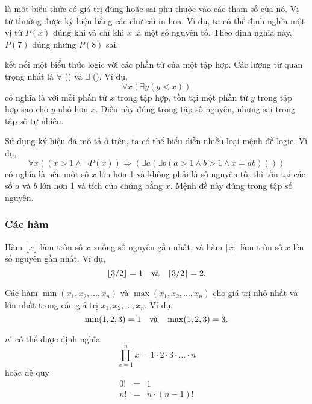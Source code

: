 
 là một biểu thức có giá trị đúng hoặc sai
phụ thuộc vào các tham số của nó.
Vị từ thường được ký hiệu bằng các chữ cái in hoa.
Ví dụ, ta có thể định nghĩa một vị từ $P(x)$
đúng khi và chỉ khi $x$ là một số nguyên tố.
Theo định nghĩa này, $P(7)$ đúng nhưng $P(8)$ sai.


 kết nối một biểu thức logic
với các phần tử của một tập hợp.
Các lượng từ quan trọng nhất là
$\forall$ () và $\exists$ ().
Ví dụ,
\[\forall x (\exists y (y < x))\]
có nghĩa là với mỗi phần tử $x$ trong tập hợp,
tồn tại một phần tử $y$ trong tập hợp
sao cho $y$ nhỏ hơn $x$.
Điều này đúng trong tập số nguyên,
nhưng sai trong tập số tự nhiên.

Sử dụng ký hiệu đã mô tả ở trên,
ta có thể biểu diễn nhiều loại mệnh đề logic.
Ví dụ,
\[\forall x ((x>1 \land \lnot P(x)) \Rightarrow (\exists a (\exists b (a > 1 \land b > 1 \land x = ab))))\]
có nghĩa là nếu một số $x$ lớn hơn 1
và không phải là số nguyên tố,
thì tồn tại các số $a$ và $b$
lớn hơn 1 và tích của chúng bằng $x$.
Mệnh đề này đúng trong tập số nguyên.

\subsubsection{Các hàm}

Hàm $\lfloor x \rfloor$ làm tròn số $x$
xuống số nguyên gần nhất, và hàm
$\lceil x \rceil$ làm tròn số $x$
lên số nguyên gần nhất. Ví dụ,
\[ \lfloor 3/2 \rfloor = 1 \hspace{10px} \textrm{và} \hspace{10px} \lceil 3/2 \rceil = 2.\]

Các hàm $\min(x_1,x_2,\ldots,x_n)$
và $\max(x_1,x_2,\ldots,x_n)$
cho giá trị nhỏ nhất và lớn nhất trong các giá trị
$x_1,x_2,\ldots,x_n$.
Ví dụ,
\[ \min(1,2,3)=1 \hspace{10px} \textrm{và} \hspace{10px} \max(1,2,3)=3.\]


 $n!$ có thể được định nghĩa
\[\prod_{x=1}^n x = 1 \cdot 2 \cdot 3 \cdot \ldots \cdot n\]
hoặc đệ quy
\[
\begin{array}{lcl}
0! & = & 1 \\
n! & = & n \cdot (n-1)! \\
\end{array}
\]


